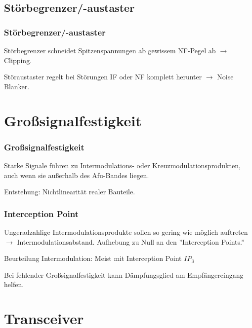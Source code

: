 \subsection{Störbegrenzer/-austaster}

\begin{frame}
    \frametitle{Störbegrenzer/-austaster}

    Störbegrenzer schneidet Spitzenspannungen ab gewissem NF-Pegel ab
    $\rightarrow$ Clipping.

    \bigskip

    Störaustaster regelt bei Störungen IF oder NF komplett herunter
    $\rightarrow$ Noise Blanker.


\end{frame}

\section{Großsignalfestigkeit}

\begin{frame}
    \frametitle{Großsignalfestigkeit}

    Starke Signale führen zu Intermodulations- oder Kreuzmodulationsprodukten,
    auch wenn sie außerhalb des Afu-Bandes liegen.

    \bigskip

    Entstehung: Nichtlinearität realer Bauteile.

\end{frame}

\begin{frame}
    \frametitle{Interception Point}

    Ungeradzahlige Intermodulationsprodukte sollen so gering wie möglich
    auftreten $\rightarrow$ Intermodulationsabstand. Aufhebung zu Null an den
    ''Interception Points.''


    Beurteilung Intermodulation: Meist mit Interception Point $IP_3$

    \bigskip

    Bei fehlender Großsignalfestigkeit kann Dämpfungsglied am
    Empfängereingang helfen.

\end{frame}

\section{Transceiver}

